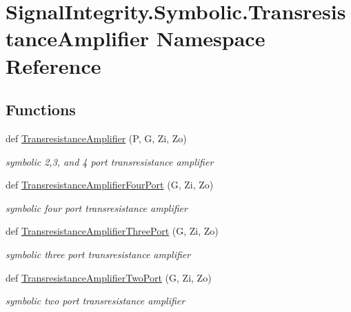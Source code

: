 \hypertarget{namespaceSignalIntegrity_1_1Symbolic_1_1TransresistanceAmplifier}{}\section{Signal\+Integrity.\+Symbolic.\+Transresistance\+Amplifier Namespace Reference}
\label{namespaceSignalIntegrity_1_1Symbolic_1_1TransresistanceAmplifier}
\subsection*{Functions}
\begin{DoxyCompactItemize}
\item 
def \hyperlink{namespaceSignalIntegrity_1_1Symbolic_1_1TransresistanceAmplifier_a48a35f198b916ddcdbbe046872460198}{Transresistance\+Amplifier} (P, G, Zi, Zo)
\begin{DoxyCompactList}\small\item\em symbolic 2,3, and 4 port transresistance amplifier \end{DoxyCompactList}\item 
def \hyperlink{namespaceSignalIntegrity_1_1Symbolic_1_1TransresistanceAmplifier_a309e2b26160f29edc89bd4be09036274}{Transresistance\+Amplifier\+Four\+Port} (G, Zi, Zo)
\begin{DoxyCompactList}\small\item\em symbolic four port transresistance amplifier \end{DoxyCompactList}\item 
def \hyperlink{namespaceSignalIntegrity_1_1Symbolic_1_1TransresistanceAmplifier_a5feb14f7df3e2e4b0765e8c9bfbc6527}{Transresistance\+Amplifier\+Three\+Port} (G, Zi, Zo)
\begin{DoxyCompactList}\small\item\em symbolic three port transresistance amplifier \end{DoxyCompactList}\item 
def \hyperlink{namespaceSignalIntegrity_1_1Symbolic_1_1TransresistanceAmplifier_af0a3b0acfe7d673727edcf8e2a033aae}{Transresistance\+Amplifier\+Two\+Port} (G, Zi, Zo)
\begin{DoxyCompactList}\small\item\em symbolic two port transresistance amplifier \end{DoxyCompactList}\end{DoxyCompactItemize}


